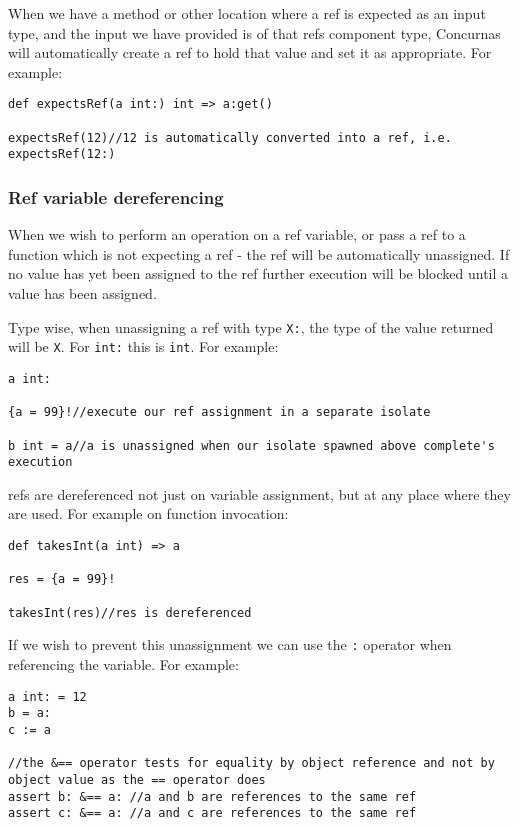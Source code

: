 \documentclass[conc-doc]{subfiles}
\begin{document}
When we have a method or other location where a ref is expected as an input type, and the input we have provided is of that refs component type, Concurnas will automatically create a ref to hold that value and set it as appropriate. For example:

\begin{lstlisting}
def expectsRef(a int:) int => a:get()

expectsRef(12)//12 is automatically converted into a ref, i.e. expectsRef(12:)
\end{lstlisting}


\subsubsection{Ref variable dereferencing}
When we wish to perform an operation on a ref variable, or pass a ref to a function which is not expecting a ref - the ref will be automatically unassigned. If no value has yet been assigned to the ref further execution will be blocked until a value has been assigned.

Type wise, when unassigning a ref with type \lstinline{X:}, the type of the value returned will be \lstinline{X}. For \lstinline{int:} this is \lstinline{int}. For example:

\begin{lstlisting}
a int:

{a = 99}!//execute our ref assignment in a separate isolate

b int = a//a is unassigned when our isolate spawned above complete's execution
\end{lstlisting}

refs are dereferenced not just on variable assignment, but at any place where they are used. For example on function invocation:

\begin{lstlisting}
def takesInt(a int) => a

res = {a = 99}!

takesInt(res)//res is dereferenced
\end{lstlisting}

If we wish to prevent this unassignment we can use the \lstinline{:} operator when referencing the variable. For example:

\begin{lstlisting}
a int: = 12
b = a:
c := a

//the &== operator tests for equality by object reference and not by object value as the == operator does
assert b: &== a: //a and b are references to the same ref
assert c: &== a: //a and c are references to the same ref
\end{lstlisting}
\end{document}
